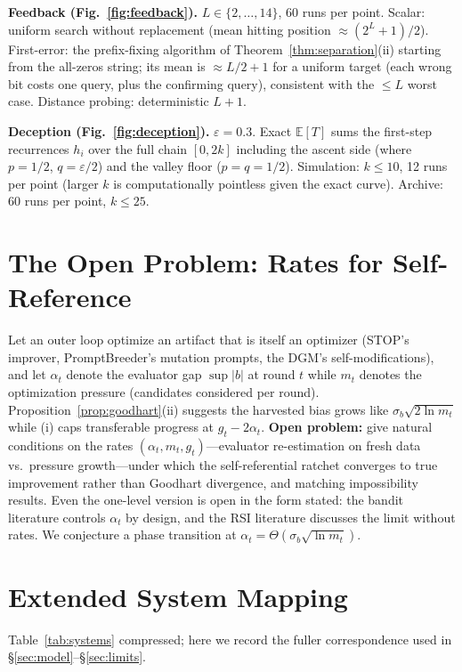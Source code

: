 \documentclass{article}
\theoremstyle{plain}
\theoremstyle{definition}
\theoremstyle{remark}
\newcommand{\E}{\mathbb{E}}
\newcommand{\eps}{\varepsilon}
\begin{document}
\textbf{Feedback (Fig.~\ref{fig:feedback}).} $L \in \{2, \dots, 14\}$, 60 runs per point. Scalar: uniform search without replacement (mean hitting position $\approx (2^L+1)/2$). First-error: the prefix-fixing algorithm of Theorem~\ref{thm:separation}(ii) starting from the all-zeros string; its mean is $\approx L/2 + 1$ for a uniform target (each wrong bit costs one query, plus the confirming query), consistent with the $\le L$ worst case. Distance probing: deterministic $L+1$.

\textbf{Deception (Fig.~\ref{fig:deception}).} $\eps = 0.3$. Exact $\E[T]$ sums the first-step recurrences $h_i$ over the full chain $[0, 2k]$ including the ascent side (where $p = 1/2$, $q = \eps/2$) and the valley floor ($p = q = 1/2$). Simulation: $k \le 10$, 12 runs per point (larger $k$ is computationally pointless given the exact curve). Archive: 60 runs per point, $k \le 25$.

\section{The Open Problem: Rates for Self-Reference}
\label{app:open}

Let an outer loop optimize an artifact that is itself an optimizer (STOP's improver, PromptBreeder's mutation prompts, the DGM's self-modifications), and let $\alpha_t$ denote the evaluator gap $\sup |b|$ at round $t$ while $m_t$ denotes the optimization pressure (candidates considered per round). Proposition~\ref{prop:goodhart}(ii) suggests the harvested bias grows like $\sigma_b\sqrt{2 \ln m_t}$ while (i) caps transferable progress at $g_t - 2\alpha_t$. \textbf{Open problem:} give natural conditions on the rates $(\alpha_t, m_t, g_t)$---evaluator re-estimation on fresh data vs.\ pressure growth---under which the self-referential ratchet converges to true improvement rather than Goodhart divergence, and matching impossibility results. Even the one-level version is open in the form stated: the bandit literature controls $\alpha_t$ by design, and the RSI literature \cite{yampolskiy2015seed, chalmers2010singularity, schmidhuber2003godel} discusses the limit without rates. We conjecture a phase transition at $\alpha_t = \Theta(\sigma_b \sqrt{\ln m_t})$.

\section{Extended System Mapping}
\label{app:mapping}

Table~\ref{tab:systems} compressed; here we record the fuller correspondence used in \S\ref{sec:model}--\S\ref{sec:limits}.
\end{document}
